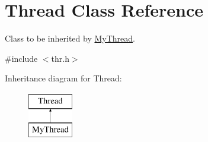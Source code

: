 \hypertarget{class_thread}{\section{Thread Class Reference}
\label{class_thread}
}


Class to be inherited by \hyperlink{class_my_thread}{My\-Thread}.  




{\ttfamily \#include $<$thr.\-h$>$}

Inheritance diagram for Thread\-:\begin{figure}[H]
\begin{center}
\leavevmode
\includegraphics[height=2.000000cm]{class_thread}
\end{center}
\end{figure}
